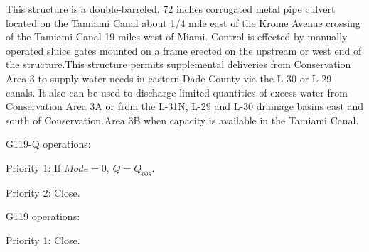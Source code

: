 This structure is a double-barreled, 72 inches corrugated metal pipe culvert located on the Tamiami Canal about 1/4 mile east of the Krome Avenue crossing of the Tamiami Canal 19 miles west of Miami. Control is effected by manually operated sluice gates mounted on a frame erected on the upstream or west end of the structure.This structure permits supplemental deliveries from Conservation Area 3 to supply water needs in eastern Dade County via the L-30 or L-29 canals. It also can be used to discharge limited quantities of excess water from Conservation Area 3A or from the L-31N, L-29 and L-30 drainage basins east and south of Conservation Area 3B when capacity is available in the Tamiami Canal.


G119-Q operations:
\begin{packed_items}
\item Priority 1: If $Mode=0$, $Q = Q_{obs}$.
\item Priority 2: Close.
\end{packed_items}

G119 operations:
\begin{packed_items}
\item Priority 1: Close.
\end{packed_items}


%
%

